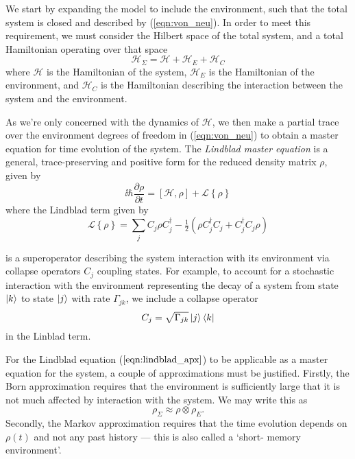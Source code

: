     We start by expanding the model to include the environment, such that the
    total system is closed and described by (\ref{eqn:von_neu}). In order to
    meet this requirement, we must consider the Hilbert space of the total
    system,  and a total Hamiltonian operating over that space
    \begin{equation}
      \mathcal{H}_\Sigma = \mathcal{H} + \mathcal{H}_E + \mathcal{H}_C
    \end{equation}
    where $\mathcal{H}$ is the Hamiltonian of the system, $\mathcal{H}_E$ is the
    Hamiltonian of the environment, and $\mathcal{H}_C$ is the Hamiltonian
    describing the interaction between the system and the environment.

    As we're only concerned with the dynamics of $\mathcal{H}$, we then make a
    partial trace over the environment degrees of freedom in (\ref{eqn:von_neu})
    to obtain a master equation for time evolution of the system. The
    \textit{Lindblad master equation} is a general, trace-preserving and
    positive form for the reduced density matrix $\rho$, given by
    \begin{equation}
      \ii \hbar \frac{\partial \rho}{\partial t} = [\mathcal{H}, \rho] + 
        \mathcal{L}\left\{ \rho \right\}
      \label{eqn:lindblad_apx}
    \end{equation}
    where the Lindblad term given by
    \begin{equation}
      \mathcal{L}\left\{ \rho \right\} = \sum_j{C_j \rho C_j^\dagger - 
      \tfrac{1}{2}\left(\rho C_j^\dagger C_j + C_j^\dagger C_j \rho \right)}
      \label{eqn:lindblad_op}
    \end{equation}

    is a superoperator describing the system interaction with its environment
    via collapse operators $C_j$ coupling states. For example, to account for a
    stochastic interaction with the environment representing the decay of a
    system from state $\Ket{k}$ to state $\Ket{j}$ with rate $\Gamma_{jk}$, we
    include a collapse operator
    $$
    C_j = \sqrt{\Gamma_{jk}}\Ket{j}\Bra{k}
    $$
    in the Linblad term.

    For the Lindblad equation ($\ref{eqn:lindblad_apx}$) to be applicable as a
    master equation for the system, a couple of approximations must be
    justified. Firstly, the Born approximation requires that the environment is
    sufficiently large that it is not much affected by interaction with the
    system. We may write this as 
    \begin{equation}
      \rho_\Sigma \approx \rho \otimes \rho_E.
    \end{equation}
    Secondly, the Markov approximation requires that the time evolution depends
    on $\rho(t)$ and not any past history --- this is also called a `short-
    memory environment'.

